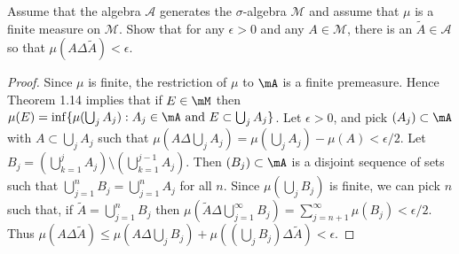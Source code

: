 \documentclass{article}
\begin{document}
 Assume that the algebra $\mathcal A$ generates the $\sigma$-algebra $\mathcal M$ and assume that $\mu$ is a finite measure on $\mathcal M$. Show that for any $\epsilon > 0$ and any $A \in \mathcal M$, there is an $\tilde A \in \mathcal A$ so that $\mu(A \Delta \tilde A) < \epsilon$.

\begin{proof}
Since $\mu$ is finite, the restriction of $\mu$ to $\mA$ is a finite premeasure.  Hence Theorem 1.14 implies that if $E \in \mM$ then $\mu(E) = \inf \{ \mu(\bigcup_j A_j) : A_j \in \mA \text{ and } E \subset \bigcup_j A_j \}$.  Let $\epsilon > 0$, and pick $(A_j) \subset \mA$ with $A \subset \bigcup_j A_j$  such that $\mu(A \Delta \bigcup_j A_j ) =
 \mu(\bigcup_j A_j) - \mu(A)  < \epsilon/2$.  Let $B_j = (\bigcup_{k=1}^j A_j) \setminus (\bigcup_{k=1}^{j-1} A_j)$. Then $(B_j) \subset \mA$ is a disjoint sequence of sets such that $\bigcup_{j=1}^n B_j = \bigcup_{j=1}^n A_j$ for all $n$. Since $\mu(\bigcup_j B_j)$ is finite, we can pick $n$ such that, if $\tilde A = \bigcup_{j=1}^n B_j$ then $\mu(\tilde A \Delta \bigcup_{j=1}^\infty B_j) = \sum_{j=n+1}^\infty \mu(B_j)   < \epsilon/2$.  Thus $\mu(A \Delta \tilde A) \le \mu(A \Delta \bigcup_j B_j) + \mu((\bigcup_j B_j) \Delta \tilde A) < \epsilon$.
\end{proof}
\end{document}

